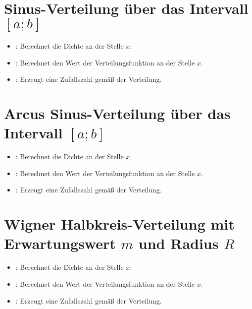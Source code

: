 \section{Sinus-Verteilung über das Intervall \texorpdfstring{$[a;b]$}{[a;b]}}

\begin{itemize}

\item
{}:
Berechnet die Dichte an der Stelle $x$.

\item
{}:
Berechnet den Wert der Verteilungsfunktion an der Stelle $x$.

\item
{}:
Erzeugt eine Zufallszahl gemäß der Verteilung.

\end{itemize}



\section{Arcus Sinus-Verteilung über das Intervall \texorpdfstring{$[a;b]$}{[a;b]}}

\begin{itemize}

\item
{}:
Berechnet die Dichte an der Stelle $x$.

\item
{}:
Berechnet den Wert der Verteilungsfunktion an der Stelle $x$.

\item
{}:
Erzeugt eine Zufallszahl gemäß der Verteilung.

\end{itemize}



\section{Wigner Halbkreis-Verteilung mit Erwartungswert \texorpdfstring{$m$}{m} und Radius \texorpdfstring{$R$}{R}}

\begin{itemize}

\item
{}:
Berechnet die Dichte an der Stelle $x$.

\item
{}:
Berechnet den Wert der Verteilungsfunktion an der Stelle $x$.

\item
{}:
Erzeugt eine Zufallszahl gemäß der Verteilung.

\end{itemize}



